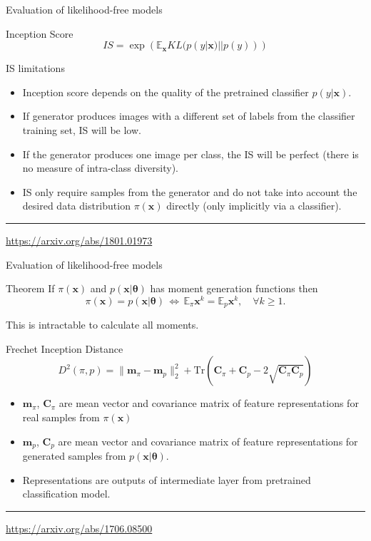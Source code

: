 \documentclass{beamer}
\newcommand{\bx}{\mathbf{x}}
\newcommand{\bC}{\mathbf{C}}
\newcommand{\bbE}{\mathbb{E}}
\newcommand{\btheta}{\boldsymbol{\theta}}
\begin{document}
\begin{frame}{Evaluation of likelihood-free models}
	\begin{block}{Inception Score}
		\vspace{-0.1cm}
		\[
			IS =  \exp \left( \bbE_{\bx} KL(p(y | \bx) || p(y)) \right)
		\]
		\vspace{-0.1cm}
	\end{block}
	\begin{block}{IS limitations}
		\begin{itemize}
			\item Inception score depends on the quality of the pretrained classifier $p(y | \bx)$.
			\item If generator produces images with a different set of labels from the classifier training set, IS will be low.
			\item If the generator produces one image per class, the IS will be perfect (there is no measure of intra-class diversity).
			\item IS only require samples from the generator and do not take into account the desired data distribution $\pi(\bx)$ directly (only implicitly via a classifier).
		\end{itemize}
	\end{block}
	\vfill
	\hrule\medskip 
	{\scriptsize \href{https://arxiv.org/abs/1801.01973}{https://arxiv.org/abs/1801.01973}}
\end{frame}
\begin{frame}{Evaluation of likelihood-free models}
	\begin{block}{Theorem}
		If $\pi(\bx)$ and $p(\bx | \btheta)$ has moment generation functions then
		\[
			\pi(\bx) = p(\bx | \btheta) \, \Leftrightarrow \, \bbE_{\pi} \bx^k = \bbE_{p} \bx^k, \quad \forall k \geq 1.
		\]
	\end{block}
	This is intractable to calculate all moments.
	\begin{block}{Frechet Inception Distance}
		\vspace{-0.1cm}
		\[
			D^2 (\pi, p) = \| \mathbf{m}_{\pi} - \mathbf{m}_{p}\|_2^2 + \text{Tr} \left( \bC_{\pi} + \bC_p - 2 \sqrt{\bC_{\pi} \bC_p} \right)
		\]
	\end{block}
	\begin{itemize}
		\item $\mathbf{m}_{\pi}$, $\bC_{\pi} $ are mean vector and covariance matrix of feature representations for real samples from $\pi(\bx)$
		\item $\mathbf{m}_{p}$, $\bC_p$ are mean vector and covariance matrix of feature representations for generated samples from $p(\bx | \btheta)$.
		\item Representations are outputs of intermediate layer from pretrained classification model.
	\end{itemize} 

	\vfill
	\hrule\medskip 
	{\scriptsize \href{https://arxiv.org/abs/1706.08500}{https://arxiv.org/abs/1706.08500}}
\end{frame}
\end{document}
